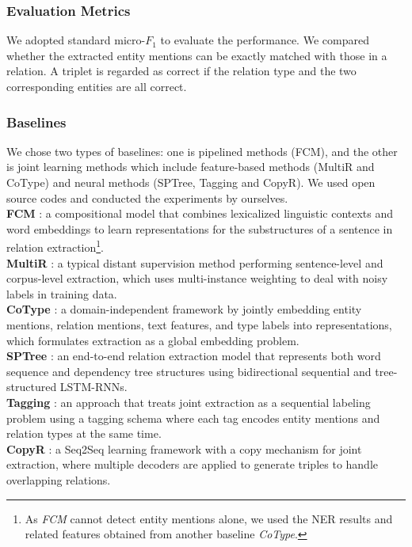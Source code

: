 \documentclass[letterpaper]{article} %
\theoremstyle{definition}
\begin{document}
\subsubsection{Evaluation Metrics}
We adopted standard micro-$F_1$ to evaluate the performance. We compared whether the extracted entity mentions can be exactly matched with those in a relation.
A triplet is regarded as correct if the relation type and the two corresponding entities are all correct. 

\subsubsection{Baselines}
We chose two types of baselines: one is pipelined methods (FCM), and the other is joint learning methods which include feature-based methods (MultiR and CoType) and neural methods (SPTree, Tagging and CopyR). We used open source codes and conducted the experiments by ourselves.
\\
\textbf{FCM} \cite{gormley2015improved}: a compositional model that combines lexicalized linguistic contexts and word embeddings to learn representations for the substructures of a sentence in relation extraction\footnote{As \textit{FCM} cannot detect entity mentions alone, we used the NER results and related features obtained from another baseline \textit{CoType}.}.
\\
\textbf{MultiR} \cite{hoffmann2011knowledge}: a typical distant supervision method performing sentence-level and corpus-level extraction, which uses multi-instance weighting to deal with noisy labels in training data.
\\
\textbf{CoType} \cite{ren2017cotype}: a domain-independent framework by jointly embedding entity mentions, relation mentions, text features, and type labels into representations, which formulates extraction as a global embedding problem. 
\\
\textbf{SPTree} \cite{miwa2016end}: an end-to-end relation extraction model that represents both word sequence and dependency tree structures using bidirectional sequential and tree-structured LSTM-RNNs.
\\
\textbf{Tagging} \cite{zheng2017joint}: an approach that treats joint extraction as a sequential labeling problem using a tagging schema where each tag encodes entity mentions and relation types at the same time.
\\
\textbf{CopyR} \cite{zeng2018extracting}: a Seq2Seq learning framework with a copy mechanism for joint extraction, where multiple decoders are applied to generate triples to handle overlapping relations.
\end{document}
